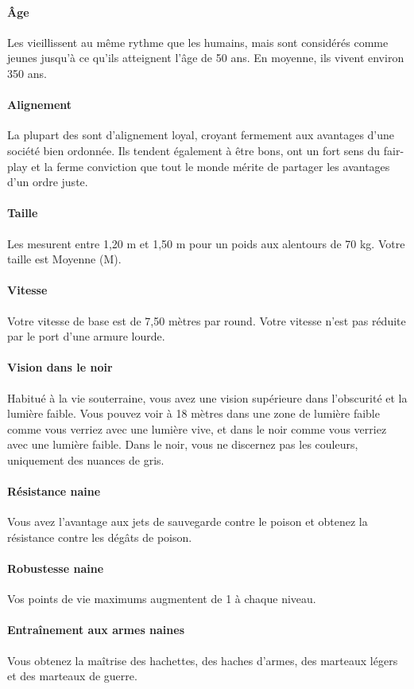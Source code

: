 \documentclass[a4paper,10pt,openany]{book}
\begin{document}
\begin{multicols}{2}
\paragraph{\^Age}
Les \Nains vieillissent au même rythme que les humains, mais sont considérés comme jeunes jusqu’à ce qu’ils atteignent l’âge de 50 ans. En moyenne,
ils vivent environ 350 ans.
\paragraph{Alignement}
La plupart des \Nains sont d’alignement loyal, croyant fermement aux avantages d’une société bien ordonnée. Ils tendent également à être bons, ont un
fort sens du fair-play et la ferme conviction que tout le monde mérite de partager les avantages d’un ordre juste.
\paragraph{Taille}
Les \Nains mesurent entre 1,20 m et 1,50 m pour un poids aux alentours de 70 kg. Votre taille est Moyenne (M).
\paragraph{Vitesse}
Votre vitesse de base est de 7,50 mètres par round. Votre vitesse n’est pas réduite par le port d’une armure lourde.
\paragraph{Vision dans le noir}
Habitué à la vie souterraine, vous avez une vision supérieure dans l’obscurité et la lumière faible. Vous pouvez voir à 18 mètres dans une zone de
lumière faible comme vous verriez avec une lumière vive, et dans le noir comme vous verriez avec une lumière faible. Dans le noir, vous ne discernez
pas les couleurs, uniquement des nuances de gris.
\paragraph{Résistance naine}
Vous avez l’avantage aux jets de sauvegarde contre le poison et obtenez la résistance contre les dégâts de poison.
\paragraph{Robustesse naine}
Vos points de vie maximums augmentent de 1 à chaque niveau.
\paragraph{Entraînement aux armes naines}
Vous obtenez la maîtrise des hachettes, des haches d’armes, des marteaux légers et des marteaux de guerre.

\end{multicols}
\end{document}
